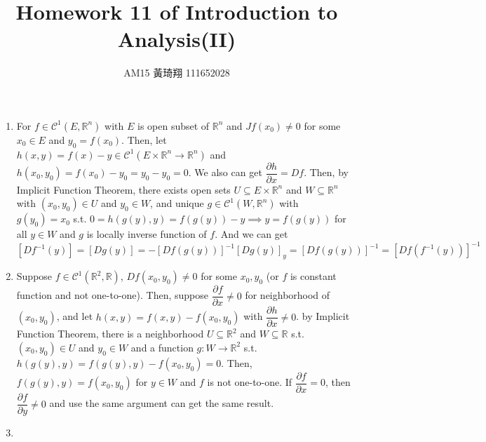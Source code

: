 \documentclass[12pt]{article}
\title{Homework 11 of Introduction to Analysis(II)}
\author{AM15 黃琦翔 111652028}
\begin{document}
\maketitle
\begin{enumerate}
    \item For $f \in \mathcal{C}^1(E, \mathbb{R}^n)$ with $E$ is open subset of $\mathbb{R}^n$ and $Jf(x_0) \neq 0$ for some $x_0\in E$ and $y_0 = f(x_0)$.
    Then, let $h(x, y) = f(x) - y \in \mathcal{C}^1(E\times \mathbb{R}^n \to \mathbb{R}^n)$ and $h(x_0, y_0) = f(x_0) - y_0 = y_0 - y_0 = 0$.
    We also can get $\dfrac{\partial h}{\partial x} = Df$.
    Then, by Implicit Function Theorem, there exists open sets $U \subseteq E\times \mathbb{R}^n$ and $W \subseteq \mathbb{R}^n$ with $(x_0, y_0) \in U$ and $y_0 \in W$,
    and unique $g \in \mathcal{C}^1(W, \mathbb{R}^n)$ with $g(y_0) = x_0$ s.t. $0 = h(g(y), y) = f(g(y)) - y \implies y = f(g(y))$ for all $y \in W$ and $g$ is locally inverse function of $f$.
    And we can get $[Df^{-1}(y)] = [Dg(y)] = - [Df(g(y))]^{-1} [Dg(y)]_y = [Df(g(y))]^{-1} = [Df(f^{-1}(y))]^{-1}$
    

    \item Suppose $f \in \mathcal{C}^1(\mathbb{R}^2, \mathbb{R})$, $Df(x_0, y_0) \neq 0$ for some $x_0, y_0$
    (or $f$ is constant function and not one-to-one).
    Then, suppose $\dfrac{\partial f}{\partial x} \neq 0$ for neighborhood of $(x_0, y_0)$,
    and let $h(x, y) = f(x, y) - f(x_0, y_0)$ with $\dfrac{\partial h}{\partial x} \neq 0$.
    by Implicit Function Theorem, there is a neighborhood $U \subseteq \mathbb{R}^2$ and $W \subseteq \mathbb{R}$ s.t. $(x_0, y_0) \in U$ and $y_0 \in W$ 
    and a function $g: W \to \mathbb{R}^2$ s.t. $h(g(y), y) = f(g(y), y) - f(x_0, y_0) = 0$.
    Then, $f(g(y), y) = f(x_0, y_0)$ for $y \in W$ and $f$ is not one-to-one.
    If $\dfrac{\partial f}{\partial x} = 0$, then $\dfrac{\partial f}{\partial y} \neq 0$ and use the same argument can get the same result.

    \item 
    
\end{enumerate}
\end{document}
